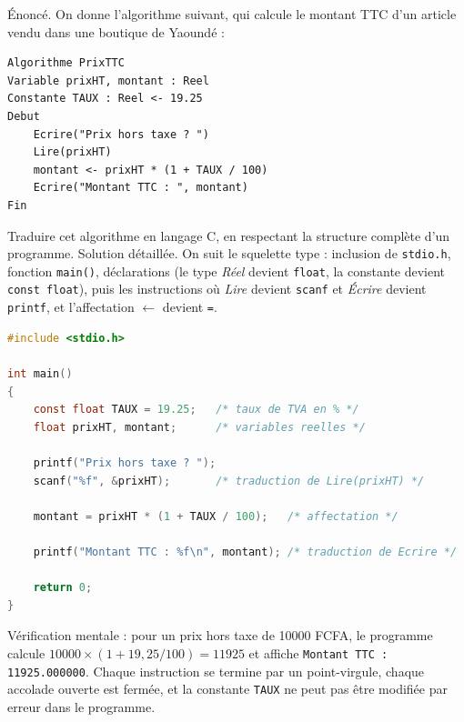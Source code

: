 \documentclass[11pt]{article}
\begin{document}
\begin{exoresolu}
Énoncé. On donne l'algorithme suivant, qui calcule le montant TTC d'un article vendu dans une boutique de Yaoundé :

\begin{lstlisting}
Algorithme PrixTTC
Variable prixHT, montant : Reel
Constante TAUX : Reel <- 19.25
Debut
    Ecrire("Prix hors taxe ? ")
    Lire(prixHT)
    montant <- prixHT * (1 + TAUX / 100)
    Ecrire("Montant TTC : ", montant)
Fin
\end{lstlisting}

Traduire cet algorithme en langage C, en respectant la structure complète d'un programme.
\tcblower
Solution détaillée. On suit le squelette type : inclusion de \texttt{stdio.h}, fonction \texttt{main()}, déclarations (le type \emph{Réel} devient \texttt{float}, la constante devient \texttt{const float}), puis les instructions où \emph{Lire} devient \texttt{scanf} et \emph{Écrire} devient \texttt{printf}, et l'affectation $\leftarrow$ devient \texttt{=}.

\begin{lstlisting}[language=C]
#include <stdio.h>

int main()
{
    const float TAUX = 19.25;   /* taux de TVA en % */
    float prixHT, montant;      /* variables reelles */

    printf("Prix hors taxe ? ");
    scanf("%f", &prixHT);       /* traduction de Lire(prixHT) */

    montant = prixHT * (1 + TAUX / 100);   /* affectation */

    printf("Montant TTC : %f\n", montant); /* traduction de Ecrire */

    return 0;
}
\end{lstlisting}

Vérification mentale : pour un prix hors taxe de \num{10000} FCFA, le programme calcule $10000 \times (1 + 19{,}25/100) = \num{11925}$ et affiche \texttt{Montant TTC : 11925.000000}. Chaque instruction se termine par un point-virgule, chaque accolade ouverte est fermée, et la constante \texttt{TAUX} ne peut pas être modifiée par erreur dans le programme.
\end{exoresolu}
\end{document}
